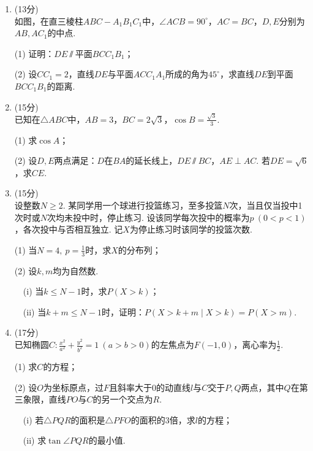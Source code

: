 \documentclass[12pt,a4paper]{article}
\begin{document}
	\vspace{0.3cm}
	
	
	\begin{enumerate}[leftmargin=*,label=\arabic*.,resume,itemsep=1.2ex]
		\item (13分)\\
		如图，在直三棱柱$ABC-A_1B_1C_1$中，$\angle ACB=90^\circ$，$AC=BC$，$D,E$分别为$AB,AC_1$的中点.
		
		(1) 证明：$DE\varparallel$平面$BCC_1B_1$；
		
		(2) 设$CC_1=2$，直线$DE$与平面$ACC_1A_1$所成的角为$45^\circ$，求直线$DE$到平面$BCC_1B_1$的距离. 
		
		\item (15分)\\
		已知在$\triangle ABC$中，$AB=3$，$BC=2\sqrt{3}$，$\cos B=\frac{\sqrt{3}}{3}$.
		
		(1) 求$\cos A$；
		
		(2) 设$D,E$两点满足：$D$在$BA$的延长线上，$DE\varparallel BC$，$AE\perp AC$. 若$DE=\sqrt{6}$，求$CE$. 
		
		\item (15分)\\
		设整数$N\ge2$. 某同学用一个球进行投篮练习，至多投篮$N$次，当且仅当投中1次时或$N$次均未投中时，停止练习. 设该同学每次投中的概率为$p\ (0<p<1)$，各次投中与否相互独立. 记$X$为停止练习时该同学的投篮次数.
		
		(1) 当$\displaystyle N=4,\ p=\frac{1}{3}$时，求$X$的分布列；
		
		(2) 设$k,m$均为自然数.
		
		\ \ (i) 当$k\le N-1$时，求$P(X>k)$；
		
		\ \ (ii) 当$k+m\le N-1$时，证明：$P(X>k+m\mid X>k)=P(X>m)$. 
		
		\item (17分)\\
		已知椭圆$\displaystyle C:\frac{x^2}{a^2}+\frac{y^2}{b^2}=1\ (a>b>0)$的左焦点为$F(-1,0)$，离心率为$\displaystyle \frac{1}{2}$.
		
		(1) 求$C$的方程；
		
		(2) 设$O$为坐标原点，过$F$且斜率大于$0$的动直线$l$与$C$交于$P,Q$两点，其中$Q$在第三象限，直线$PO$与$C$的另一个交点为$R$.
		
		\ \ (i) 若$\triangle PQR$的面积是$\triangle PFO$的面积的$3$倍，求$l$的方程；
		
		\ \ (ii) 求$\tan\angle PQR$的最小值. 
		

\end{enumerate}
\end{document}
